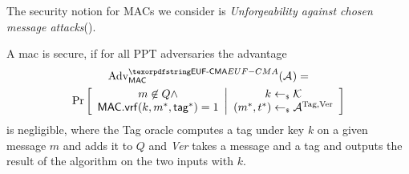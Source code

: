 The security notion for MACs we consider is \emph{Unforgeability against chosen message attacks}(\ufcma).
\begin{definition}
  A mac \mac is \ufcma secure, if for all PPT adversaries \Adv the advantage
  \begin{multline*}
    \adv{\ufcma}{\mac}(\Adv) = \\\Pr
    \left[
      \begin{array}{c}
        m \not \in Q \land\\
        \macvrf(k, m^*, \mtag^*) = 1
      \end{array}
      \middle\vert
      \begin{array}{c}
        k\getsr \mackeyspace\\
        (m^*, t^*) \getsr \Adv^{\text{Tag}, \text{Ver}}
      \end{array}
    \right]
  \end{multline*}
  is negligible, where the Tag oracle computes a tag under key $k$ on a given message $m$ and adds it to $Q$ and
  \emph{Ver} takes a message and a tag and outputs the result of the \macvrf algorithm on the two inputs with $k$.
\end{definition}



